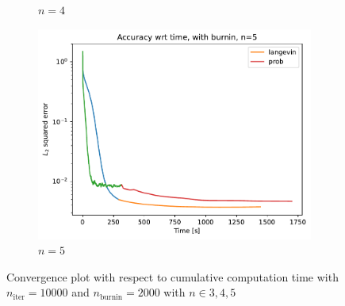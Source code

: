 \documentclass[12pt]{memoir}
\newcommand{\nitern}[1]{$n_{\text{iter}}=#1$}
\newcommand{\nburninn}[1]{$n_{\text{burnin}}=#1$}
\begin{document}
\begin{figure}[H]
\begin{subfigure}[b]{0.49\textwidth}
        \caption{$n=4$}

        \label{fig:conv-plot-time-diff-n-4-sub}

    \end{subfigure}

    \begin{subfigure}[b]{0.49\textwidth}


        \centering

        \includegraphics[width=\textwidth]{figures/experiments/baseline/diff_n_qubits/iters_acc_comp_time_no_avg_n5-1.png}

        \caption{$n=5$}

        \label{fig:conv-plot-time-diff-n-5-sub}

    \end{subfigure}

    \caption{Convergence plot with respect to cumulative computation time with \nitern{10000} and \nburninn{2000} with $n\in{3,4,5}$}

    \label{fig:conv-plot-time-diff-n}

\end{figure}
\end{document}
